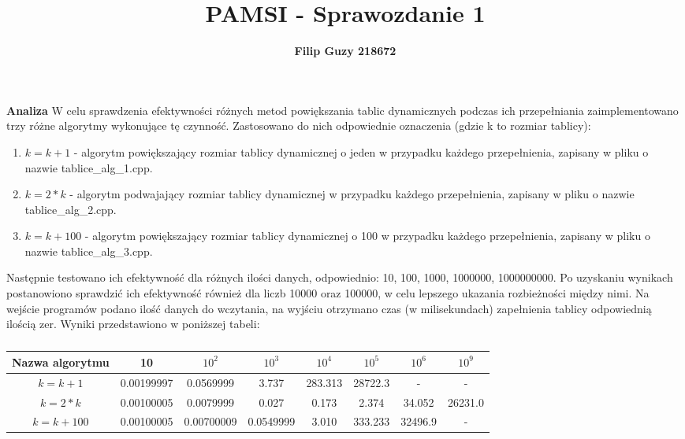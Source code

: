 \documentclass[10pt, a4paper]{article}
\title{\textbf{PAMSI - Sprawozdanie 1}}
\author{\textbf{Filip Guzy 218672}}
\begin{document}
\maketitle

\begin{flushleft}
\textbf{Analiza} \newline \newline
W celu sprawdzenia efektywności różnych metod powiększania tablic dynamicznych podczas ich przepełniania zaimplementowano trzy różne algorytmy wykonujące tę czynność. Zastosowano do nich odpowiednie oznaczenia (gdzie k to rozmiar tablicy): 
\begin{enumerate}
\item $k=k+1$ - algorytm powiększający rozmiar tablicy dynamicznej o jeden w przypadku każdego przepełnienia, zapisany w pliku o nazwie tablice\_alg\_1.cpp. 
\item $k=2*k$ - algorytm podwajający rozmiar tablicy dynamicznej w przypadku każdego przepełnienia, zapisany w pliku o nazwie tablice\_alg\_2.cpp.
\item $k=k+100$ - algorytm powiększający rozmiar tablicy dynamicznej o 100 w przypadku każdego przepełnienia, zapisany w pliku o nazwie tablice\_alg\_3.cpp.
\end{enumerate}

Następnie testowano ich efektywność dla różnych ilości danych, odpowiednio: 10, 100, 1000, 1000000, 1000000000. Po uzyskaniu wynikach postanowiono sprawdzić ich efektywność również dla liczb 10000 oraz 100000, w celu lepszego ukazania rozbieżności między nimi. Na wejście programów podano ilość danych do wczytania, na wyjściu otrzymano czas (w milisekundach) zapełnienia tablicy odpowiednią ilością zer. Wyniki przedstawiono w poniższej tabeli:

\begin{table}[h]
\centering
\caption{}
\begin{tabular}{|c|c|c|c|c|c|c|c|} \hline
Nazwa algorytmu & 10 & $10^2$ & $10^3$ & $10^4$ & $10^5$ & $10^6$ & $10^9$ \\ \hline
$k=k+1$ & 0.00199997 & 0.0569999 & 3.737 & 283.313 & 28722.3 & - & - \\ \hline
$k=2*k$ & 0.00100005 & 0.0079999 & 0.027 & 0.173 & 2.374 & 34.052 & 26231.0 \\ \hline
$k=k+100$ & 0.00100005 & 0.00700009 & 0.0549999 & 3.010 & 333.233 & 32496.9 & - \\ \hline
\end{tabular}
\end{table}


\end{flushleft}
\end{document}
